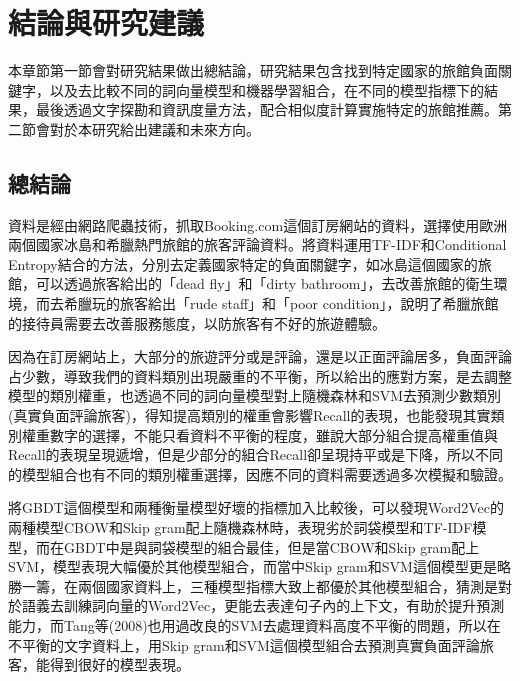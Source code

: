 %
%

\chapter{結論與研究建議}

	本章節第一節會對研究結果做出總結論，研究結果包含找到特定國家的旅館負面關鍵字，以及去比較不同的詞向量模型和機器學習組合，在不同的模型指標下的結果，最後透過文字探勘和資訊度量方法，配合相似度計算實施特定的旅館推薦。第二節會對於本研究給出建議和未來方向。

\section{總結論}

	資料是經由網路爬蟲技術，抓取Booking.com這個訂房網站的資料，選擇使用歐洲兩個國家冰島和希臘熱門旅館的旅客評論資料。將資料運用TF-IDF和Conditional Entropy結合的方法，分別去定義國家特定的負面關鍵字，如冰島這個國家的旅館，可以透過旅客給出的「dead fly」和「dirty bathroom」，去改善旅館的衛生環境，而去希臘玩的旅客給出「rude staff」和「poor condition」，說明了希臘旅館的接待員需要去改善服務態度，以防旅客有不好的旅遊體驗。
	
	因為在訂房網站上，大部分的旅遊評分或是評論，還是以正面評論居多，負面評論占少數，導致我們的資料類別出現嚴重的不平衡，所以給出的應對方案，是去調整模型的類別權重，也透過不同的詞向量模型對上隨機森林和SVM去預測少數類別(真實負面評論旅客)，得知提高類別的權重會影響Recall的表現，也能發現其實類別權重數字的選擇，不能只看資料不平衡的程度，雖說大部分組合提高權重值與Recall的表現呈現遞增，但是少部分的組合Recall卻呈現持平或是下降，所以不同的模型組合也有不同的類別權重選擇，因應不同的資料需要透過多次模擬和驗證。
	
	將GBDT這個模型和兩種衡量模型好壞的指標加入比較後，可以發現Word2Vec的兩種模型CBOW和Skip gram配上隨機森林時，表現劣於詞袋模型和TF-IDF模型，而在GBDT中是與詞袋模型的組合最佳，但是當CBOW和Skip gram配上SVM，模型表現大幅優於其他模型組合，而當中Skip gram和SVM這個模型更是略勝一籌，在兩個國家資料上，三種模型指標大致上都優於其他模型組合，猜測是對於語義去訓練詞向量的Word2Vec，更能去表達句子內的上下文，有助於提升預測能力，而Tang等(2008)也用過改良的SVM去處理資料高度不平衡的問題，所以在不平衡的文字資料上，用Skip gram和SVM這個模型組合去預測真實負面評論旅客，能得到很好的模型表現。
	
